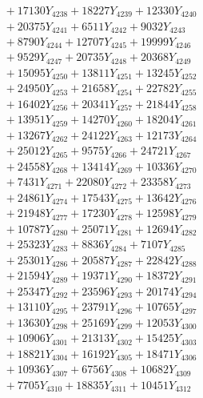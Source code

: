 \documentclass[a4paper,10pt]{article}
\begin{document}
{\begin{align}
&\;  + 17130 Y_{4238} + 18227 Y_{4239} + 12330 Y_{4240} \\[0.3ex]
&\;  + 20375 Y_{4241} + 6511 Y_{4242} + 9032 Y_{4243} \\[0.3ex]
&\;  + 8790 Y_{4244} + 12707 Y_{4245} + 19999 Y_{4246} \\[0.3ex]
&\;  + 9529 Y_{4247} + 20735 Y_{4248} + 20368 Y_{4249} \\[0.3ex]
&\;  + 15095 Y_{4250} + 13811 Y_{4251} + 13245 Y_{4252} \\[0.3ex]
&\;  + 24950 Y_{4253} + 21658 Y_{4254} + 22782 Y_{4255} \\[0.3ex]
&\;  + 16402 Y_{4256} + 20341 Y_{4257} + 21844 Y_{4258} \\[0.5ex]\allowbreak
&\;  + 13951 Y_{4259} + 14270 Y_{4260} + 18204 Y_{4261} \\[0.3ex]
&\;  + 13267 Y_{4262} + 24122 Y_{4263} + 12173 Y_{4264} \\[0.3ex]
&\;  + 25012 Y_{4265} + 9575 Y_{4266} + 24721 Y_{4267} \\[0.3ex]
&\;  + 24558 Y_{4268} + 13414 Y_{4269} + 10336 Y_{4270} \\[0.3ex]
&\;  + 7431 Y_{4271} + 22080 Y_{4272} + 23358 Y_{4273} \\[0.3ex]
&\;  + 24861 Y_{4274} + 17543 Y_{4275} + 13642 Y_{4276} \\[0.3ex]
&\;  + 21948 Y_{4277} + 17230 Y_{4278} + 12598 Y_{4279} \\[0.3ex]
&\;  + 10787 Y_{4280} + 25071 Y_{4281} + 12694 Y_{4282} \\[0.3ex]
&\;  + 25323 Y_{4283} + 8836 Y_{4284} + 7107 Y_{4285} \\[0.3ex]
&\;  + 25301 Y_{4286} + 20587 Y_{4287} + 22842 Y_{4288} \\[0.5ex]\allowbreak
&\;  + 21594 Y_{4289} + 19371 Y_{4290} + 18372 Y_{4291} \\[0.3ex]
&\;  + 25347 Y_{4292} + 23596 Y_{4293} + 20174 Y_{4294} \\[0.3ex]
&\;  + 13110 Y_{4295} + 23791 Y_{4296} + 10765 Y_{4297} \\[0.3ex]
&\;  + 13630 Y_{4298} + 25169 Y_{4299} + 12053 Y_{4300} \\[0.3ex]
&\;  + 10906 Y_{4301} + 21313 Y_{4302} + 15425 Y_{4303} \\[0.3ex]
&\;  + 18821 Y_{4304} + 16192 Y_{4305} + 18471 Y_{4306} \\[0.3ex]
&\;  + 10936 Y_{4307} + 6756 Y_{4308} + 10682 Y_{4309} \\[0.3ex]
&\;  + 7705 Y_{4310} + 18835 Y_{4311} + 10451 Y_{4312} \\[0.3ex]

\end{align}}
\end{document}
